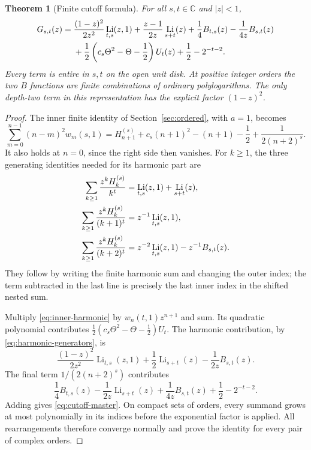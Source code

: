 \documentclass[11pt,a4paper]{article}
\numberwithin{equation}{section}
\newtheorem{theorem}{Theorem}[section]
\theoremstyle{definition}
\theoremstyle{remark}
\DeclareMathOperator{\Li}{Li}
\newcommand{\C}{\mathbb C}
\begin{document}
\begin{theorem}[Finite cutoff formula]\label{thm:cutoff}
For all $s,t\in\C$ and $|z|<1$,
\begin{align}
 G_{s,t}(z)={}&\frac{(1-z)^2}{2z^2}\Li_{t,s}(z,1)
 +\frac{z-1}{2z}\Li_{s+t}(z)
 +\frac14B_{t,s}(z)-\frac1{4z}B_{s,t}(z)\notag\\
 &+\frac12\left(c_s\Theta^2-\Theta-\frac12\right)U_t(z)
 +\frac12-2^{-t-2}.
 \label{eq:cutoff-master}
\end{align}
Every term is entire in $s,t$ on the open unit disk. At positive
integer orders the two $B$ functions are finite combinations of
ordinary polylogarithms. The only depth-two term in this representation
has the explicit factor $(1-z)^2$.
\end{theorem}

\begin{proof}
The inner finite identity of Section~\ref{sec:ordered}, with $a=1$,
becomes
\begin{equation}\label{eq:inner-harmonic}
 \sum_{m=0}^{n-1}(n-m)^2w_m(s,1)
 =H_{n+1}^{(s)}+c_s(n+1)^2-(n+1)-\frac12
   +\frac1{2(n+2)^s}.
\end{equation}
It also holds at $n=0$, since the right side then vanishes.
For $k\ge1$, the three generating identities needed for its harmonic
part are
\begin{align}
 \sum_{k\ge1}\frac{z^kH_k^{(s)}}{k^t}
   &=\Li_{t,s}(z,1)+\Li_{s+t}(z),\notag\\
 \sum_{k\ge1}\frac{z^kH_k^{(s)}}{(k+1)^t}
   &=z^{-1}\Li_{t,s}(z,1),\notag\\
 \sum_{k\ge1}\frac{z^kH_k^{(s)}}{(k+2)^t}
   &=z^{-2}\Li_{t,s}(z,1)-z^{-1}B_{s,t}(z).
 \label{eq:harmonic-generators}
\end{align}
They follow by writing the finite harmonic sum and changing the
outer index; the term subtracted in the last line is precisely the
last inner index in the shifted nested sum.

Multiply \eqref{eq:inner-harmonic} by $w_n(t,1)z^{n+1}$ and sum.
Its quadratic polynomial contributes
$\tfrac12(c_s\Theta^2-\Theta-\tfrac12)U_t$.
The harmonic contribution, by \eqref{eq:harmonic-generators}, is
\[
 \frac{(1-z)^2}{2z^2}\Li_{t,s}(z,1)
 +\frac12\Li_{s+t}(z)-\frac1{2z}B_{s,t}(z).
\]
The final term $1/(2(n+2)^s)$ contributes
\[
 \frac14B_{t,s}(z)-\frac1{2z}\Li_{s+t}(z)
 +\frac1{4z}B_{s,t}(z)+\frac12-2^{-t-2}.
\]
Adding gives \eqref{eq:cutoff-master}. On compact sets of orders,
every summand grows at most polynomially in its indices before the
exponential factor is applied. All rearrangements therefore converge
normally and prove the identity for every pair of complex orders.
\end{proof}
\end{document}
